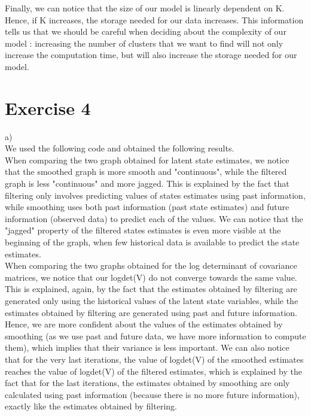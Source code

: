 \documentclass[12pt,a4paper]{report} %
\begin{document}
Finally, we can notice that the size of our model is linearly dependent on K. Hence, if K increases, the storage needed for our data increases. This information tells us that we should be careful when deciding about the complexity of our model : increasing the number of clusters that we want to find will not only increase the computation time, but will also increase the storage needed for our model.\\




\chapter{Exercise 4}

\item a)\\

We used the following code and obtained the following results. \\

When comparing the two graph obtained for latent state estimates, we notice that the smoothed graph is more smooth and "continuous", while the filtered graph is less "continuous" and more jagged. This is explained by the fact that filtering only involves predicting values of states estimates using past information, while smoothing uses both past information (past state estimates) and future information (observed data) to predict each of the values. We can notice that the "jagged" property of the filtered states estimates is even more visible at the beginning of the graph, when few historical data is available to predict the state estimates.\\

When comparing the two graphs obtained for the log determinant of covariance matrices, we notice that our logdet(V) do not converge towards the same value. This is explained, again, by the fact that the estimates obtained by filtering are generated only using the historical values of the latent state variables, while the estimates obtained by filtering are generated using past and future information. Hence, we are more confident about the values of the estimates obtained by smoothing (as we use past and future data, we have more information to compute them), which implies that their variance is less important. We can also notice that for the very last iterations, the value of logdet(V) of the smoothed estimates reaches the value of logdet(V) of the filtered estimates, which is explained by the fact that for the last iterations, the estimates obtained by smoothing are only calculated using past information (because there is no more future information), exactly like the estimates obtained by filtering. \\
\end{document}
